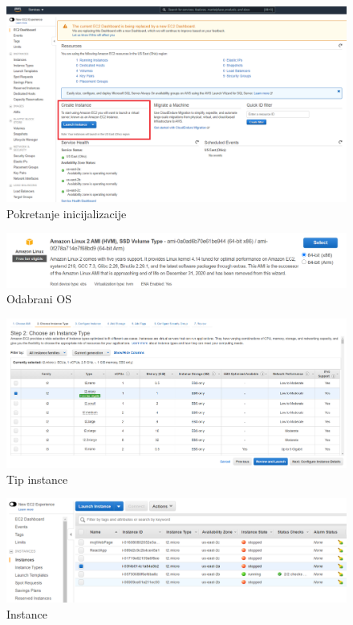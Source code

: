 			
			\begin{figure}[h]
				\includegraphics[width=\textwidth]{slike/deployment_slike/launchingInstance.png}
				\centering
				\caption{Pokretanje inicijalizacije}
			\end{figure}
		
			\begin{figure}[h]
				\includegraphics[width=\textwidth]{slike/deployment_slike/virtualOS.png}
				\centering
				\caption{Odabrani OS}
			\end{figure}
		
			\begin{figure}[h]
				\includegraphics[width=\textwidth]{slike/deployment_slike/instanceType.png}
				\centering
				\caption{Tip instance}
			\end{figure}
			
			\begin{figure}[h]
				\includegraphics[width=\textwidth]{slike/deployment_slike/mojeInstance.png}
				\centering
				\caption{Instance}
			\end{figure}
			
